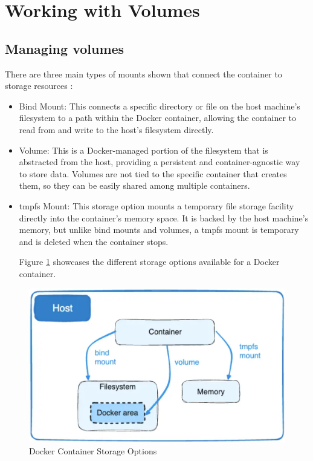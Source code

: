 \documentclass{article}
\begin{document}
\section{Working with Volumes}

\subsection{Managing volumes}

There are three main types of mounts shown that connect the container to storage resources \cite{dockerstorage}:

\begin{itemize}
\item Bind Mount: This connects a specific directory or file on the host machine's filesystem to a path within the Docker container, allowing the container to read from and write to the host's filesystem directly.

\item Volume: This is a Docker-managed portion of the filesystem that is abstracted from the host, providing a persistent and container-agnostic way to store data. Volumes are not tied to the specific container that creates them, so they can be easily shared among multiple containers.

\item tmpfs Mount: This storage option mounts a temporary file storage facility directly into the container's memory space. It is backed by the host machine's memory, but unlike bind mounts and volumes, a tmpfs mount is temporary and is deleted when the container stops.

Figure \ref{fig:docvol} showcases the different storage options available for a Docker container. 
\end{itemize}
\begin{figure}[h!]
\includegraphics[scale=.5]{figures/docker_volume.png}
\caption{Docker Container Storage Options \cite{dockervol}}
\label{fig:docvol}
\end{figure}
\end{document}
